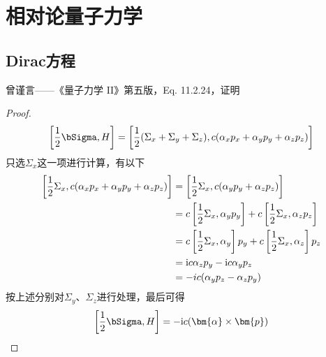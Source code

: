 \chapter{相对论量子力学}

\section{Dirac方程}
曾谨言——《量子力学 II》第五版，Eq. 11.2.24，证明
\begin{proof}
    \begin{equation*}
        \left[ \frac{1}{2} \bSigma, H \right] =
                        \left[ \frac{1}{2}(\Sigma_x + \Sigma_y + \Sigma_z), 
                        c(\alpha_x p_x + \alpha_y p_y + \alpha_z p_z) \right]
    \end{equation*}
    只选$\Sigma_x$这一项进行计算，有以下
    \begin{equation}
        \begin{aligned}
            \left[\frac{1}{2}\Sigma_x, c(\alpha_x p_x + \alpha_y p_y + \alpha_z p_z)\right]
          &= \left[ \frac{1}{2} \Sigma_x, c(\alpha_y p_y + \alpha_z p_z) \right] \\
          &=    c \left[ \frac{1}{2} \Sigma_x, \alpha_y p_y\right] 
              + c \left[ \frac{1}{2} \Sigma_x, \alpha_z p_z\right]   \\
          &=    c \left[ \frac{1}{2} \Sigma_x, \alpha_y\right] p_y
              + c \left[ \frac{1}{2} \Sigma_x, \alpha_z\right] p_z \\
          &=    {\rm i} c \alpha_z p_y  - {\rm i} c \alpha_y p_z \\
          &= -ic(\alpha_y p_z - \alpha_z p_y)
        \end{aligned}
    \end{equation}
    按上述分别对$\Sigma_y$、$\Sigma_z$进行处理，最后可得
    \begin{equation*}
        \left[ \frac{1}{2} \bSigma, H \right] = -{\rm i} c (\bm{\alpha} \times \bm{p})
    \end{equation*}
\end{proof}

